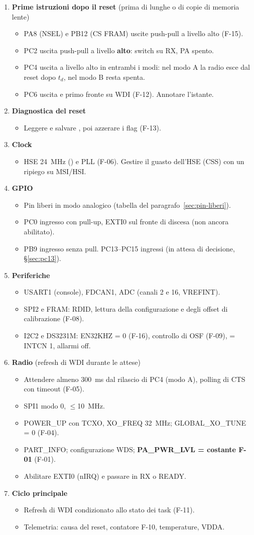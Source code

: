 \newcommand{\chk}{\item[$\square$]}
\begin{enumerate}[label=\arabic*.,leftmargin=*]
\item \textbf{Prime istruzioni dopo il reset} (prima di  lunghe o di copie di memoria lente)
 \begin{itemize}[leftmargin=8mm]
 \chk PA8 (NSEL) e PB12 (CS FRAM) uscite push-pull a livello alto (F-15).
 \chk PC2 uscita push-pull a livello \textbf{alto}: switch su RX, PA spento.
 \chk PC4 uscita a livello alto in entrambi i modi: nel modo A la radio esce dal reset dopo $t_d$, nel modo B resta spenta.
 \chk PC6 uscita e primo fronte su WDI (F-12). Annotare l'istante.
 \end{itemize}
\item \textbf{Diagnostica del reset}
 \begin{itemize}[leftmargin=8mm]
 \chk Leggere e salvare , poi azzerare i flag (F-13).
 \end{itemize}
\item \textbf{Clock}
 \begin{itemize}[leftmargin=8mm]
 \chk HSE \SI{24}{\mega\hertz} () e PLL (F-06). Gestire il guasto dell'HSE (CSS) con un ripiego su MSI/HSI.
 \end{itemize}
\item \textbf{GPIO}
 \begin{itemize}[leftmargin=8mm]
 \chk Pin liberi in modo analogico (tabella del paragrafo~\ref{sec:pin-liberi}).
 \chk PC0 ingresso con pull-up, EXTI0 sul fronte di discesa (non ancora abilitato).
 \chk PB9 ingresso senza pull. PC13--PC15 ingressi (in attesa di decisione, §\ref{sec:pc13}).
 \end{itemize}
\item \textbf{Periferiche}
 \begin{itemize}[leftmargin=8mm]
 \chk USART1 (console), FDCAN1, ADC (canali 2 e 16, VREFINT).
 \chk SPI2 e FRAM: RDID, lettura della configurazione e degli offset di calibrazione (F-08).
 \chk I2C2 e DS3231M: EN32KHZ = 0 (F-16), controllo di OSF (F-09),  = INTCN 1, allarmi off.
 \end{itemize}
\item \textbf{Radio} (refresh di WDI durante le attese)
 \begin{itemize}[leftmargin=8mm]
 \chk Attendere almeno \SI{300}{\milli\second} dal rilascio di PC4 (modo A), polling di CTS con timeout (F-05).
 \chk SPI1 modo 0, $\leq$\SI{10}{\mega\hertz}.
 \chk POWER\_UP con TCXO, XO\_FREQ \SI{32}{\mega\hertz}; GLOBAL\_XO\_TUNE = 0 (F-04).
 \chk PART\_INFO; configurazione WDS; \textbf{PA\_PWR\_LVL = costante F-01} (F-01).
 \chk Abilitare EXTI0 (nIRQ) e passare in RX o READY.
 \end{itemize}
\item \textbf{Ciclo principale}
 \begin{itemize}[leftmargin=8mm]
 \chk Refresh di WDI condizionato allo stato dei task (F-11).
 \chk Telemetria: causa del reset, contatore F-10, temperature, VDDA.
 \end{itemize}
\end{enumerate}

